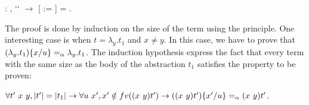 \begin{coqdoccode}
\coqdocemptyline
\coqdocnoindent
{} : \coqdockw{\ensuremath{\forall}}   ,  ``   \ensuremath{\rightarrow} [ := ] = .\coqdoceol
\end{coqdoccode}
 The proof is done by induction on the size of the term  using the  principle. One interesting case is when $t = \lambda_y.t_1$ and $x \neq y$. In this case, we have to prove that $(\lambda_y.t_1)\{x / u\} =_\alpha \lambda_y.t_1$. The induction hypothesis express the fact that every term with the same size as the body of the abstraction $t_1$ satisfies the property to be proven:


$\forall t'\ x\ y, |t'| = |t_1| \to \forall u\ x', x' \notin fv((x\ y) t') \to ((x\ y) t')\{x' / u\} =_\alpha (x\ y) t'$.


